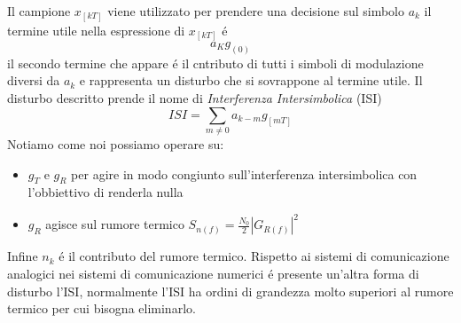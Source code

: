\begin{itemize}
{\[                    \]
                    Il campione $x_{[kT]}$ viene utilizzato per prendere una decisione sul simbolo $a_k$ il termine utile nella espressione di $x_{[kT]}$
                    é 
                    \[
                        a_Kg_{(0)}
                    \]\label{ISI}
                    il secondo termine che appare é il cntributo di tutti i simboli di modulazione diversi da $a_k$ e rappresenta un disturbo che si 
                    sovrappone al termine utile. Il disturbo descritto prende il nome di \emph{Interferenza Intersimbolica} (ISI)
                    \[
                        ISI =  \sum_{m\neq 0}a_{k-m}g_{[mT]}
                    \]
                    Notiamo come noi possiamo operare su:
                    \begin{itemize}
                        \item {
                            $g_T$ e $g_R$ per agire in modo congiunto sull'interferenza intersimbolica con l'obbiettivo di renderla nulla
                        }
                        \item {
                            $g_R$ agisce sul rumore termico $S_{n(f)} = \frac{N_0}{2} \left|G_{R(f)}\right|^2$
                        }
                    \end{itemize}
                    Infine $n_k$ é il contributo del rumore termico. Rispetto ai sistemi di comunicazione analogici nei sistemi di comunicazione numerici
                    é presente un'altra forma di disturbo l'ISI, normalmente l'ISI ha ordini di grandezza molto superiori al rumore termico per cui bisogna 
                    eliminarlo.
                }
            \end{itemize}
